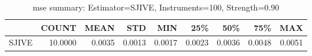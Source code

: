 \begin{table}[ht]
\centering
\caption{mse summary: Estimator=SJIVE, Instruments=100, Strength=0.90}
\begin{tabular}{lrrrrrrrr}
\toprule
 & COUNT & MEAN & STD & MIN & 25\% & 50\% & 75\% & MAX \\
\midrule
SJIVE & 10.0000 & 0.0035 & 0.0013 & 0.0017 & 0.0023 & 0.0036 & 0.0048 & 0.0051 \\
\bottomrule
\end{tabular}
\end{table}

